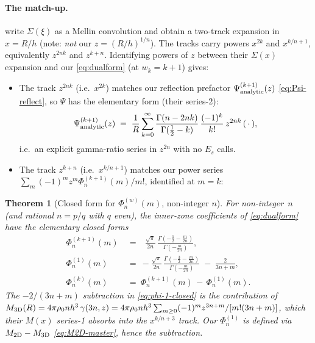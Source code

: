 \documentclass{article}
\newtheorem{theorem}{Theorem}
\begin{document}
\paragraph{The match-up.}
\citet{RetanaMontenegro2012} write $\Sigma(\xi)$ as a Mellin convolution and obtain a
two-track expansion in $x=R/h$ (note: \emph{not} our $z=(R/h)^{1/n}$).  The
tracks carry powers $x^{2k}$ and $x^{k/n+1}$, equivalently $z^{2nk}$ and
$z^{k+n}$.  Identifying powers of $z$ between their $\Sigma(x)$ expansion and
our \eqref{eq:dualform} (at $w_k=k+1$) gives:
\begin{itemize}
\item The track $z^{2nk}$ (i.e.\ $x^{2k}$) matches our reflection prefactor
$\Psi^{(k+1)}_{\rm analytic}(z)$ \eqref{eq:Psi-reflect}, so
$\Psi$ has the elementary form (their series-2):
\begin{equation}\label{eq:Psi-becker}
\Psi^{(k+1)}_{\rm analytic}(z)
   \;=\;\frac{1}{R}\sum_{k=0}^{\infty}
        \frac{\Gamma(n-2nk)}{\Gamma(\tfrac12-k)}\,\frac{(-1)^k}{k!}\,z^{2nk}\,(\,\cdot\,),
\end{equation}
i.e.\ an explicit gamma-ratio series in $z^{2n}$ with no $E_s$ calls.
\item The track $z^{k+n}$ (i.e.\ $x^{k/n+1}$) matches our power series
$\sum_m(-1)^m z^m \Phi^{(k+1)}_n(m)/m!$, identified at $m=k$:
\end{itemize}
\begin{theorem}[Closed form for $\Phi^{(w)}_n(m)$, non-integer $n$]\label{thm:phi-closed}
For non-integer~$n$ (and rational $n=p/q$ with $q$ even), the inner-zone
coefficients of \eqref{eq:dualform} have the elementary closed forms
\begin{align}
\Phi^{(k+1)}_n(m)\ &=\ \ \;\frac{\sqrt\pi}{2n}\,
   \frac{\Gamma\!\left(-\tfrac12-\tfrac{m}{2n}\right)}{\Gamma\!\left(-\tfrac{m}{2n}\right)},
   \label{eq:phi-kp1-closed}\\[2pt]
\Phi^{(1)}_n(m)\ &=\ -\frac{\sqrt\pi}{2n}\,
   \frac{\Gamma\!\left(-\tfrac32-\tfrac{m}{2n}\right)}{\Gamma\!\left(-\tfrac{m}{2n}\right)}
   \;-\;\frac{2}{3n+m},
   \label{eq:phi-1-closed}\\[2pt]
\Phi^{(k)}_n(m)\ &=\ \Phi^{(k+1)}_n(m)\,-\,\Phi^{(1)}_n(m).
   \label{eq:phi-k-closed}
\end{align}
The $-2/(3n+m)$ subtraction in \eqref{eq:phi-1-closed} is the contribution of
$M_{\rm 3D}(R)=4\pi\rho_0 nh^3\,\gamma(3n,z)=4\pi\rho_0 nh^3\sum_{m\ge0}
(-1)^m z^{3n+m}/[m!(3n+m)]$, which their $M(x)$ series-1 absorbs into the
$x^{k/n+3}$ track.  Our $\Phi^{(1)}_n$ is defined via $M_{\rm 2D}-M_{\rm 3D}$
\eqref{eq:M2D-master}, hence the subtraction.
\end{theorem}
\end{document}
